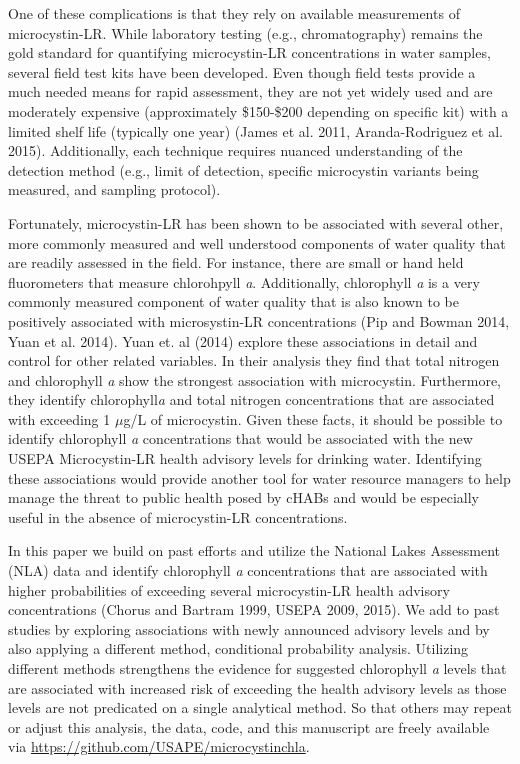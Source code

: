 \documentclass[11pt,]{article}
\begin{document}
One of these complications is that they rely on available measurements
of microcystin-LR. While laboratory testing (e.g., chromatography)
remains the gold standard for quantifying microcystin-LR concentrations
in water samples, several field test kits have been developed. Even
though field tests provide a much needed means for rapid assessment,
they are not yet widely used and are moderately expensive (approximately
\$150-\$200 depending on specific kit) with a limited shelf life
(typically one year) (James et al. 2011, Aranda-Rodriguez et al. 2015).
Additionally, each technique requires nuanced understanding of the
detection method (e.g., limit of detection, specific microcystin
variants being measured, and sampling protocol).

Fortunately, microcystin-LR has been shown to be associated with several
other, more commonly measured and well understood components of water
quality that are readily assessed in the field. For instance, there are
small or hand held fluorometers that measure chlorohpyll \emph{a}.
Additionally, chlorophyll \emph{a} is a very commonly measured component
of water quality that is also known to be positively associated with
microsystin-LR concentrations (Pip and Bowman 2014, Yuan et al. 2014).
Yuan et. al (2014) explore these associations in detail and control for
other related variables. In their analysis they find that total nitrogen
and chlorophyll \emph{a} show the strongest association with
microcystin. Furthermore, they identify chlorophyll\emph{a} and total
nitrogen concentrations that are associated with exceeding 1 \(\mu\)g/L
of microcystin. Given these facts, it should be possible to identify
chlorophyll \emph{a} concentrations that would be associated with the
new USEPA Microcystin-LR health advisory levels for drinking water.
Identifying these associations would provide another tool for water
resource managers to help manage the threat to public health posed by
cHABs and would be especially useful in the absence of microcystin-LR
concentrations.

In this paper we build on past efforts and utilize the National Lakes
Assessment (NLA) data and identify chlorophyll \emph{a} concentrations
that are associated with higher probabilities of exceeding several
microcystin-LR health advisory concentrations (Chorus and Bartram 1999,
USEPA 2009, 2015). We add to past studies by exploring associations with
newly announced advisory levels and by also applying a different method,
conditional probability analysis. Utilizing different methods
strengthens the evidence for suggested chlorophyll \emph{a} levels that
are associated with increased risk of exceeding the health advisory
levels as those levels are not predicated on a single analytical method.
So that others may repeat or adjust this analysis, the data, code, and
this manuscript are freely available via
\href{https://github.com/USAPE/microcystinchla}{\url{https://github.com/USAPE/microcystinchla}}.
\end{document}
